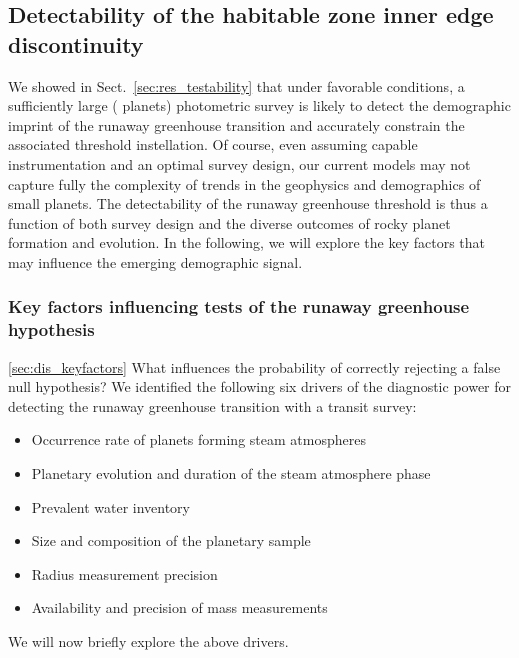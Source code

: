 \documentclass[twocolumn,twocolappendix]{aastex631}
\begin{document}
\subsection{Detectability of the habitable zone inner edge discontinuity}
We showed in Sect.~\ref{sec:res_testability} that under favorable conditions, a sufficiently large ( planets) photometric survey is likely to detect the demographic imprint of the runaway greenhouse transition and accurately constrain the associated threshold instellation.
Of course, even assuming capable instrumentation and an optimal survey design, our current models may not capture fully the complexity of trends in the geophysics and demographics of small planets.
The detectability of the runaway greenhouse threshold is thus a function of both survey design and the diverse outcomes of rocky planet formation and evolution.
In the following, we will explore the key factors that may influence the emerging demographic signal.

\subsubsection{Key factors influencing tests of the runaway greenhouse hypothesis}\ref{sec:dis_keyfactors}
What influences the probability of correctly rejecting a false null hypothesis?
We identified the following six drivers of the diagnostic power for detecting the runaway greenhouse transition with a transit survey:
\begin{itemize}
    \item Occurrence rate of planets forming steam atmospheres
    \item Planetary evolution and duration of the steam atmosphere phase
    \item Prevalent water inventory
    \item Size and composition of the planetary sample
    \item Radius measurement precision
    \item Availability and precision of mass measurements
\end{itemize}
We will now briefly explore the above drivers.
\end{document}
